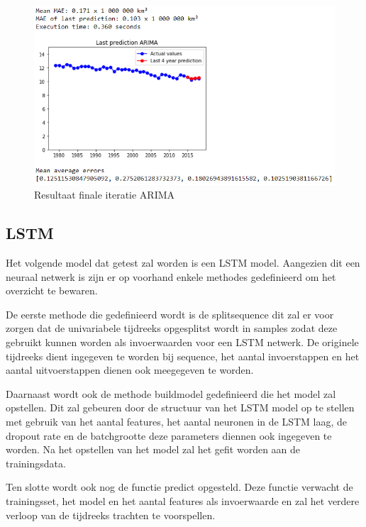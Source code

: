 \begin{figure}
    \centering
    \caption{Resultaat finale iteratie ARIMA}
    \label{fig:uvnsarima}
    \includegraphics[width=1\linewidth]{uv_ns_ARIMA}
\end{figure}

\clearpage
\subsection{LSTM}

Het volgende model dat getest zal worden is een LSTM model. Aangezien dit een neuraal netwerk is zijn er op voorhand enkele methodes gedefinieerd om het overzicht te bewaren. 

De eerste methode die gedefinieerd wordt is de split\textunderscore sequence dit zal er voor zorgen dat de univariabele tijdreeks opgesplitst wordt in samples zodat deze gebruikt kunnen worden als invoerwaarden voor een LSTM netwerk. De originele tijdreeks dient ingegeven te worden bij sequence, het aantal invoerstappen en het aantal uitvoerstappen dienen ook meegegeven te worden.

Daarnaast wordt ook de methode build\textunderscore model gedefinieerd die het model zal opstellen. Dit zal gebeuren door de structuur van het LSTM model op te stellen met gebruik van het aantal features, het aantal neuronen in de LSTM laag, de dropout rate en de batchgrootte deze parameters diennen ook ingegeven te worden. Na het opstellen van het model zal het gefit worden aan de trainingsdata.

Ten slotte wordt ook nog de functie predict opgesteld. Deze functie verwacht de trainingsset, het model en het aantal features als invoerwaarde en zal het verdere verloop van de tijdreeks trachten te voorspellen. 

